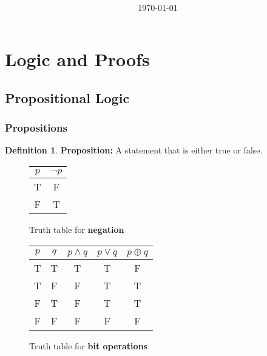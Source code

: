 \documentclass[article, 11pt]{article}
\title{
    \vspace{2in}
    \textmd{\textbf{\studyTitle}}
    \normalsize\vspace{0.1in}\\
    \vspace{0.1in}\large{\text{\class}} \\
    \vspace{0.1in}\text{\professor}\\
    \vspace{0.1in}\large\text{Final: \text{\final}}\\
    \vspace{3in}
}
\author{\name}
\date{\today}
\theoremstyle{definition}
\newtheorem{definition}{Definition}[subsubsection]
\newcommand{\xor}{\oplus} %
\begin{document}
    \maketitle
    \thispagestyle{empty}
    \pagebreak
    \tableofcontents
    \pagebreak
    
    \section{Logic and Proofs}  
    \subsection{Propositional Logic}
    \subsubsection{Propositions}
    \begin{definition}
        \textbf{Proposition:} A statement that is either true or false.
    \end{definition}    
    \begin{figure}[H]
        \centering
            \begin{tabular}{c|c}
                $p$ & $\neg p$ \\
                \hline
                T & F \\
                F & T
            \end{tabular}
        \caption{Truth table for \textbf{negation}}
    \end{figure}
    \begin{figure}[H]
        \centering
            \begin{tabular}{c|c|c|c|c}
                $p$ & $q$ & $p \land q$ & $p \lor q$ & $p \xor q$ \\
                \hline
                T & T & T & T & F \\
                T & F & F & T & T \\
                F & T & F & T & T \\
                F & F & F & F & F
            \end{tabular}
        \caption{Truth table for \textbf{bit operations}}
    \end{figure}
\end{document}
